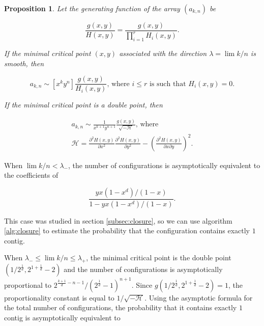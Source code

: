 \documentclass{article}
\newtheorem{proposition}{Proposition}
\begin{document}
\begin{proposition}
Let the generating function of the array $(a_{k,n})$ be

\begin{equation*}
\frac{g(x,y)}{H(x,y)} =
\frac{g(x,y)}{\prod_{i=1}^rH_i(x,y)}.
\end{equation*}

If the minimal critical point $(x,y)$ associated with the direction
$\lambda = \lim k/n$ is smooth, then

\begin{equation*}
a_{k,n} \sim [x^ky^n] \frac{g(x,y)}{H_i(x,y)}\text{, where $i \leq r$ is
such that } H_i(x,y) = 0.
\end{equation*}

If the minimal critical point is a double point, then

\begin{equation*}
\begin{split}
a_{k,n} \sim \frac{1}{x^{k+1}y^{n+1}} \frac{g(x,y)}{\sqrt{-\mathcal{H}}}
\text{, where} \\
\mathcal{H} = \frac{\partial^2H(x,y)}{\partial x^2}
  \frac{\partial^2H(x,y)}{\partial y^2} -
\left( \frac{\partial^2H(x,y)}{\partial x\partial y} \right)^2.
\end{split}
\end{equation*}
\end{proposition}

When $\lim k/n < \lambda_-$, the number of configurations is
asymptotically equivalent to the coefficients of

\begin{equation*}
\frac{yx(1-x^d)/(1-x)}{1-yx(1-x^d)/(1-x)}.
\end{equation*}

This case was studied in section \ref{subsec:closure}, so we can use
algorithm \ref{alg:closure} to estimate the probability that the
configuration contains exactly $1$ contig.

When $\lambda_- \leq \lim k/n \leq \lambda_+$, the minimal critical point
is the double point $\left( 1/2^{\frac{1}{d}}, 2^{1+\frac{1}{d}}-2
\right)$ and the number of configurations is asymptotically proportional
to $2^{\frac{k+1}{d}-n-1}/(2^{\frac{1}{d}}-1)^{n+1}$. Since
$g(1/2^{\frac{1}{d}}, 2^{1+\frac{1}{d}}-2) = 1$, the proportionality
constant is equal to $1/\sqrt{-\mathcal{H}}$.  Using the asymptotic
formula for the total number of configurations, the probability that it
contains exactly $1$ contig is asymptotically equivalent to
\end{document}
